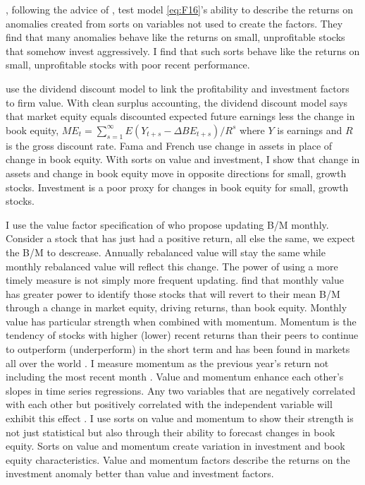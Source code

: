 \textcite{fama2016dissecting}, following the advice of
\textcite{lewellen2010skeptical}, test model \ref{eq:F16}'s ability to describe
the returns on anomalies created from sorts on variables not used to create the
factors. They find that many anomalies
behave like the returns on small, unprofitable stocks that
somehow invest aggressively. I find that such sorts behave like the returns on
small, unprofitable stocks with poor recent performance.

\textcite{fama2006profitability} use the dividend discount model to link the
profitability and investment factors to firm value.
With clean surplus accounting, the dividend discount model says that market
equity equals discounted expected future earnings less the change in book
equity,
$ME_t = \sum_{s=1}^\infty E(Y_{t+s}-\Delta BE_{t+s})/R^s$
where $Y$ is earnings and $R$ is the gross discount rate.
Fama and French use change in assets in place of change in book equity.
With sorts on value and investment, I show that change in assets and change in
book equity move in opposite directions for small, growth stocks.
Investment is a poor proxy for changes in book equity for small, growth stocks.

I use the value factor specification of \textcite{asness2013devil} who propose
updating B/M monthly. Consider a stock that has just had a positive return, all
else the same, we expect the B/M to descrease. Annually rebalanced value will
stay the same while monthly rebalanced value will reflect this change. The
power of using a more timely measure is not simply more frequent updating.
\textcite{kok2017facts} find that monthly value has greater power to identify
those stocks that will revert to their mean
B/M through a change in market equity, driving
returns, than book equity. Monthly value has particular strength when combined
with momentum. Momentum is the tendency of stocks with higher (lower) recent
returns than their peers to continue to outperform (underperform) in the short
term \parencite{jegadeesh1993returns} and has been found in markets all over
the world \parencite{asness2013value}. I measure momentum as the previous
year's return not including the most recent month
\parencite{fama2016dissecting}. Value and momentum enhance each other's slopes
in time series regressions. Any two variables that are negatively correlated
with each other but positively correlated with the independent variable will
exhibit this effect \parencite{fama2015incremental}. I use sorts on value and
momentum to show their strength is not just statistical but also through their
ability to forecast changes in book equity. Sorts on value and momentum create
variation in investment and book equity characteristics. Value and momentum
factors describe the returns on the investment anomaly better than value and
investment factors.

